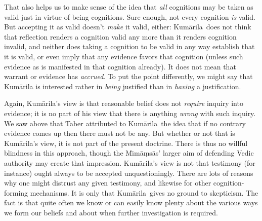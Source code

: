 \documentclass[11pt,letterpaper,oneside]{amsart}
\newcommand{\kum}{Kum\={a}rila}
\begin{document}
That also helps us to make sense of the idea that \emph{all} cognitions may be taken as valid just in virtue of being cognitions. Sure enough, not every cognition \emph{is} valid. But accepting it as valid doesn't \emph{make} it valid, either: \kum\ does not think that reflection renders a cognition valid any more than it renders cognition invalid, and neither does taking a cognition to be valid in any way establish that it is valid, or even imply that any evidence favors that cognition (unless such evidence as is manifested in that cognition already). It does not mean that warrant or evidence has \emph{accrued}. To put the point differently, we might say that Kum\=arila is interested rather in \emph{being} justified than in \emph{having} a justification.



Again, Kum\=arila's view is that reasonable belief does not \emph{require} inquiry into evidence; it is no part of his view that there is anything \emph{wrong} with such inquiry. We saw above that Taber attributed to \kum\ the idea that if no contrary evidence comes up then there must not be any. But whether or not that is \kum's view, it is not part of the present doctrine. There is thus no willful blindness in this approach, though the M\={\i}m\=a\d ms\=as' larger aim of defending Vedic authority may create that impression. \kum's view is not that testimony (for instance) ought always to be accepted unquestioningly. There are lots of reasons why one might distrust any given testimony, and likewise for other cognition-forming mechanisms. It is only that \kum\ gives no ground to skepticism. The fact is that quite often we know or can easily know plenty about the various ways we form our beliefs and about when further investigation is required. %







\end{document}
